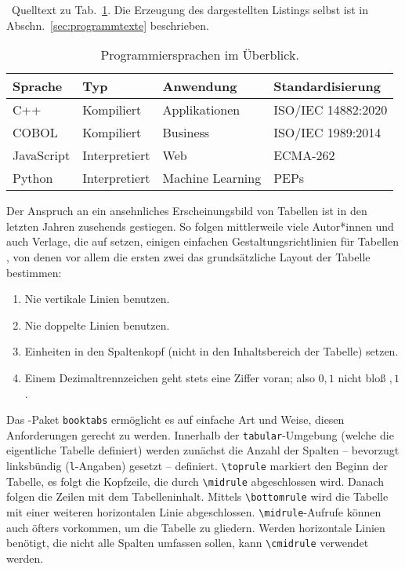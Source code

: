 \begin{program}
	\caption{\latex\ Quelltext zu Tab.~\ref{tab:programming-languages}.
	Die Erzeugung des dargestellten Listings selbst ist in Abschn.\
	\ref{sec:programmtexte} beschrieben.}
	\label{prog:programming-languages-source}
%
\begin{LaTeXCode}[numbers=none]
\begin{table}
	\caption{Programmiersprachen im Überblick.}
	\label{tab:programming-languages}
	\centering
	\setlength{\tabcolsep}{10pt} %
	\def\arraystretch{1.25}      %
	\begin{tabular}{@{}llll@{}}
		\toprule
		Sprache    & Typ           & Anwendung        & Standardisierung   \\
		\midrule
		C++        & Kompiliert    & Applikationen    & ISO/IEC 14882:2020 \\
		COBOL      & Kompiliert    & Business         & ISO/IEC 1989:2014  \\
		JavaScript & Interpretiert & Web              & ECMA-262           \\
		Python     & Interpretiert & Machine Learning & PEPs               \\
		\bottomrule
	\end{tabular}
\end{table}
\end{LaTeXCode}
%
\end{program}

Der Anspruch an ein ansehnliches Erscheinungsbild von Tabellen ist in den
letzten Jahren zusehends gestiegen. So folgen mittlerweile viele Autor*innen
und auch Verlage, die auf \latex setzen, einigen einfachen
Gestaltungsrichtlinien für Tabellen \cite{Fear2020}, von denen vor allem die
ersten zwei das grundsätzliche Layout der Tabelle bestimmen:

\begin{enumerate}
	\item Nie vertikale Linien benutzen.
	\item Nie doppelte Linien benutzen.
	\item Einheiten in den Spaltenkopf (nicht in den Inhaltsbereich der
	Tabelle) setzen.
	\item Einem Dezimaltrennzeichen geht stets eine Ziffer voran; also $0{,}1$
	nicht bloß ${,}1$.
\end{enumerate}

Das \latex-Paket \texttt{booktabs} ermöglicht es auf einfache Art und Weise,
diesen Anforderungen gerecht zu werden. Innerhalb der
\texttt{tabular}-Umgebung (welche die eigentliche Tabelle definiert) werden
zunächst die Anzahl der Spalten -- bevorzugt linksbündig (\texttt{l}-Angaben)
gesetzt -- definiert. \verb|\toprule| markiert den Beginn der Tabelle, es
folgt die Kopfzeile, die durch \verb|\midrule| abgeschlossen wird. Danach
folgen die Zeilen mit dem Tabelleninhalt. Mittels \verb|\bottomrule| wird die
Tabelle mit einer weiteren horizontalen Linie abgeschlossen.
\verb|\midrule|-Aufrufe können auch öfters vorkommen, um die Tabelle zu
gliedern. Werden horizontale Linien benötigt, die nicht alle Spalten umfassen
sollen, kann \verb|\cmidrule| verwendet werden.

